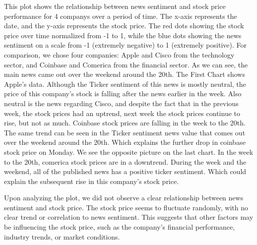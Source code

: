 This plot shows the relationship between news sentiment and stock price performance for 4 companys over a period of time. The x-axis represents the date, and the y-axis represents the stock price. The red dots showing the stock price over time normalized from -1 to 1, while the blue dots showing the news sentiment on a scale from -1 (extremely negative) to 1 (extremely positive). For comparison, we chose four companies: Apple and Cisco from the technology sector, and Coinbase and Comerica from the financial sector. As we can see, the main news came out over the weekend around the 20th. The First Chart shows Apple's data.  Although the Ticker sentiment of this news is mostly neutral, the price of this company's stock is falling after the news earlier in the week.  Also neutral is the news regarding Cisco, and despite the fact that in the previous week, the stock prices had an uptrend, next week the stock prices continue to rise, but not as much.  Coinbase stock prices are falling in the week to the 20th.  The same trend can be seen in the Ticker sentiment news value that comes out over the weekend around the 20th.  Which explains the further drop in coinbase stock price on Monday.   We see the opposite picture on the last chart.   In the week to the 20th, comerica stock prices are in a downtrend.  During the week and the weekend, all of the published news has a positive ticker sentiment.  Which could explain the subsequent rise in this company's stock price.


Upon analyzing the plot, we did not observe a clear relationship between news sentiment and stock price. The stock price seems to fluctuate randomly, with no clear trend or correlation to news sentiment. This suggests that other factors may be influencing the stock price, such as the company's financial performance, industry trends, or market conditions.



